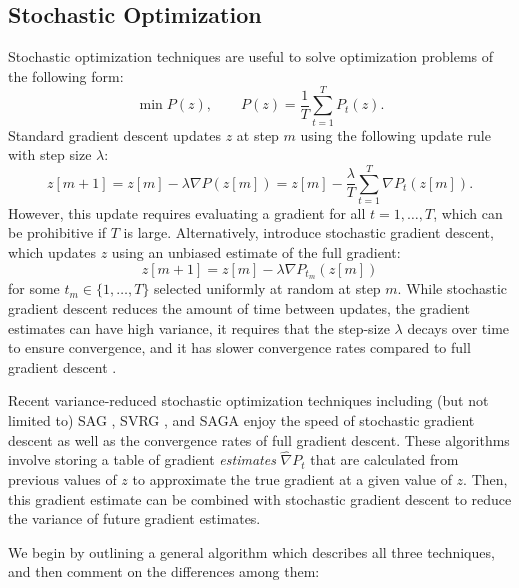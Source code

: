 \subsection{Stochastic Optimization}

Stochastic optimization techniques are useful to solve optimization problems of the following form:
%
\begin{equation*}
    \min P(z), \qquad P(z) = \frac{1}{T}\sum_{t = 1}^T P_t(z).
\end{equation*}
%
Standard gradient descent updates $z$ at step $m$ using the following update rule with step size $\lambda$:
%
\begin{equation*}
    z[m+1] = z[m] - \lambda \nabla P(z[m]) =  z[m] - \frac{\lambda}{T} \sum_{t=1}^T \nabla P_t(z[m]).
\end{equation*}
%
However, this update requires evaluating a gradient for all $t = 1,\ldots,T$, which can be prohibitive if $T$ is large. Alternatively, \citet{Robbins:1951} introduce stochastic gradient descent, which updates $z$ using an unbiased estimate of the full gradient:
%
\begin{equation*}
    z[m+1] = z[m] - \lambda \nabla P_{t_m}(z[m])
\end{equation*}
%
for some $t_m \in \{1,\ldots,T\}$ selected uniformly at random at step $m$. While stochastic gradient descent reduces the amount of time between updates, the gradient estimates can have high variance, it requires that the step-size $\lambda$ decays over time to ensure convergence, and it has slower convergence rates compared to full gradient descent \citep{Schmidt:2017}.

Recent variance-reduced stochastic optimization techniques including (but not limited to) SAG \citep{Schmidt:2017}, SVRG \citep{Johnson:2013}, and SAGA \citep{Defazio:2014} enjoy the speed of stochastic gradient descent as well as the convergence rates of full gradient descent. These algorithms involve storing a table of gradient \textit{estimates} $\widehat \nabla P_t$ that are calculated from previous values of $z$ to approximate the true gradient at a given value of $z$. Then, this gradient estimate can be combined with stochastic gradient descent to reduce the variance of future gradient estimates. 

We begin by outlining a general algorithm which describes all three techniques, and then comment on the differences among them:

